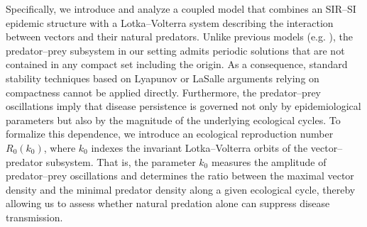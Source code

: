 \documentclass{amsart}
\theoremstyle{definition}
\theoremstyle{remark}
\numberwithin{equation}{section}
\begin{document}
Specifically, we introduce and analyze a coupled model that combines an SIR–SI epidemic structure with a Lotka–Volterra system describing the interaction between vectors and their natural predators. Unlike previous models (e.g. \cite{Zhou2014}), the predator–prey subsystem in our setting admits periodic solutions that are not contained in any compact set including the origin. As a consequence, standard stability techniques based on Lyapunov or LaSalle arguments relying on compactness cannot be applied directly. Furthermore, the predator–prey oscillations imply that disease persistence is governed not only by epidemiological parameters but also by the magnitude of the underlying ecological cycles. To formalize this dependence, we introduce an ecological reproduction number $R_0(k_0)$, where $k_0$ indexes the invariant Lotka–Volterra orbits of the vector–predator subsystem. That is, the parameter $k_0$ measures the amplitude of predator–prey oscillations and determines the ratio between the maximal vector density and the minimal predator density along a given ecological cycle, thereby allowing us to assess whether natural predation alone can suppress disease transmission.
\end{document}
